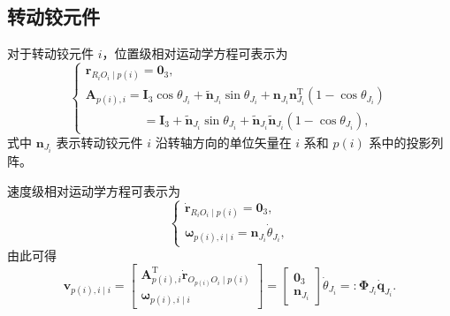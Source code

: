 \subsection{转动铰元件}

对于转动铰元件 $i$，位置级相对运动学方程可表示为
\begin{equation}\label{eq:10.16}
  \begin{cases}
    \boldsymbol{r}_{R_i O_i \mid p(i)} = \boldsymbol{0}_3, \\
    \boldsymbol{A}_{p(i),i} = \boldsymbol{I}_3 \cos\theta_{J_i} + \tilde{\boldsymbol{n}}_{J_i} \sin\theta_{J_i} + \boldsymbol{n}_{J_i} \boldsymbol{n}_{J_i}^{\mathrm{T}} (1 - \cos\theta_{J_i}) \\
    \phantom{\boldsymbol{A}_{p(i),i} =} = \boldsymbol{I}_3 + \tilde{\boldsymbol{n}}_{J_i} \sin\theta_{J_i} + \tilde{\boldsymbol{n}}_{J_i} \tilde{\boldsymbol{n}}_{J_i} (1 - \cos\theta_{J_i}),
  \end{cases}
\end{equation}
式中 $\boldsymbol{n}_{J_i}$ 表示转动铰元件 $i$ 沿转轴方向的单位矢量在 $i$ 系和 $p(i)$ 系中的投影列阵。

速度级相对运动学方程可表示为
\begin{equation}\label{eq:10.17}
  \begin{cases}
    \dot{\boldsymbol{r}}_{R_i O_i \mid p(i)} = \boldsymbol{0}_3, \\
    \boldsymbol{\omega}_{p(i),i \mid i} = \boldsymbol{n}_{J_i} \dot{\theta}_{J_i},
  \end{cases}
\end{equation}
由此可得
\begin{equation}\label{eq:10.18}
  \boldsymbol{v}_{p(i),i \mid i} = \begin{bmatrix} \boldsymbol{A}_{p(i),i}^{\mathrm{T}} \dot{\boldsymbol{r}}_{O_{p(i)} O_i \mid p(i)} \\ \boldsymbol{\omega}_{p(i),i \mid i} \end{bmatrix}
  = \begin{bmatrix} \boldsymbol{0}_3 \\ \boldsymbol{n}_{J_i} \end{bmatrix} \dot{\theta}_{J_i}
  =: \boldsymbol{\Phi}_{J_i} \dot{\boldsymbol{q}}_{J_i}.
\end{equation}

